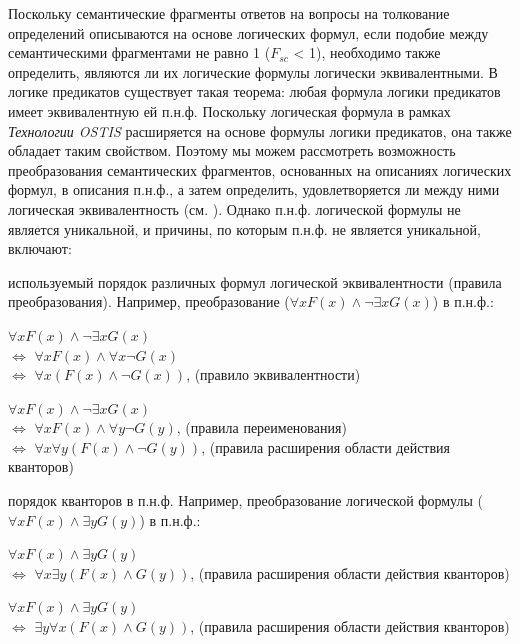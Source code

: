 Поскольку семантические фрагменты ответов на вопросы на толкование определений описываются на основе логических формул, если подобие между семантическими фрагментами не равно 1 ($F_{sc}$ < 1), необходимо также определить, являются ли их логические формулы логически эквивалентными. В логике предикатов существует такая теорема: любая формула логики предикатов имеет эквивалентную ей п.н.ф. Поскольку логическая формула в рамках \textit{Технологии OSTIS} расширяется на основе формулы логики предикатов, она также обладает таким свойством. Поэтому мы можем рассмотреть возможность преобразования семантических фрагментов, основанных на описаниях логических формул, в описания п.н.ф., а затем определить, удовлетворяется ли между ними логическая эквивалентность (см. ). Однако п.н.ф. логической формулы не является уникальной, и причины, по которым п.н.ф. не является уникальной, включают:

\begin{textitemize}
	\item используемый порядок различных формул логической эквивалентности (правила преобразования). Например, преобразование ($\forall x F(x) \land \neg \exists x G(x)$) в п.н.ф.:
	
	\begin{textitemize}
		\item $\forall x F(x) \land \neg \exists x G(x)$ \\ $\Leftrightarrow$ $\forall x F(x) \land \forall x \neg G(x)$ \\ $\Leftrightarrow$ $\forall x (F(x) \land \neg G(x)) $, (правило эквивалентности) 
		\item $\forall x F(x) \land \neg \exists x G(x)$ \\ $\Leftrightarrow$ $\forall x F(x) \land  \forall y \neg G(y)$, (правила переименования) \\ $\Leftrightarrow$ $\forall x \forall y (F(x) \land \neg G(y)) $, (правила расширения области действия кванторов)
	\end{textitemize}
	
	\item порядок кванторов в п.н.ф. Например, преобразование логической формулы ($\forall x F(x)\wedge \exists y G(y)$) в п.н.ф.:
	
	\begin{textitemize}
		\item $\forall x F(x)\wedge \exists y G(y)$ \\
		$\Leftrightarrow$ $\forall x \exists y (F(x) \wedge G(y))$, (правила расширения области действия кванторов)
		\item $\forall x F(x)\wedge \exists y G(y)$ \\
		$\Leftrightarrow$ $\exists y \forall x (F(x) \wedge G(y))$, (правила расширения области действия кванторов)
	\end{textitemize}
	
\end{textitemize}

